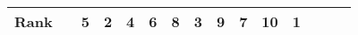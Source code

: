 \begin{tabular}{ll|rrrrrrrrr|rrrr}


  


  
  Rank & &
  5 & 2 & 4 & 6 & 8 & 3 & 9 & 7 & 10 & 1 &  &  &  \\\hline\hline
\end{tabular}


